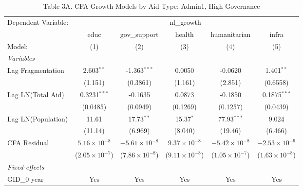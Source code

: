 \par\endgroup



\begin{table}[H]
   \caption{Table 3A. CFA Growth Models by Aid Type: Admin1, High Governance}
   \centering
   \begin{tabular}{lccccc}
      \tabularnewline \midrule \midrule
      Dependent Variable: & \multicolumn{5}{c}{nl\_growth}\\
                         & educ                    & gov\_support            & health                  & humanitarian            & infra \\   
      Model:             & (1)                     & (2)                     & (3)                     & (4)                     & (5)\\  
      \midrule
      \emph{Variables}\\
      Lag Fragmentation  & 2.603$^{**}$            & -1.363$^{***}$          & 0.0050                  & -0.0620                 & 1.401$^{**}$\\   
                         & (1.151)                 & (0.3861)                & (1.161)                 & (2.851)                 & (0.6558)\\   
      Lag LN(Total Aid)  & 0.3231$^{***}$          & -0.1635                 & 0.0873                  & -0.1850                 & 0.1875$^{***}$\\   
                         & (0.0485)                & (0.0949)                & (0.1269)                & (0.1257)                & (0.0439)\\   
      Lag LN(Population) & 11.61                   & 17.73$^{**}$            & 15.37$^{*}$             & 77.93$^{***}$           & 9.024\\   
                         & (11.14)                 & (6.969)                 & (8.040)                 & (19.46)                 & (6.466)\\   
      CFA Residual       & $5.16\times 10^{-8}$    & $-5.61\times 10^{-8}$   & $9.37\times 10^{-8}$    & $-5.42\times 10^{-8}$   & $-2.53\times 10^{-9}$\\    
                         & ($2.05\times 10^{-7}$)  & ($7.86\times 10^{-8}$)  & ($9.11\times 10^{-8}$)  & ($1.05\times 10^{-7}$)  & ($1.63\times 10^{-8}$)\\    
      \midrule
      \emph{Fixed-effects}\\
      GID\_0-year        & Yes                     & Yes                     & Yes                     & Yes                     & Yes\\  

\end{tabular}
\end{table}
